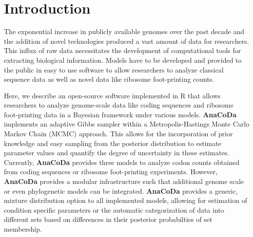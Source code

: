 \documentclass{bioinfo}
\newcommand{\pkg}[1]{{\fontseries{b}\selectfont #1}}
\newcommand{\package}{\textbf{AnaCoDa }} %
\begin{document}
\begin{abstract}
\section{Availability:}
\pkg{\package} is freely available under the Mozilla Public License 2.0
on CRAN (\url{http://cran.r-project.org/package=anacoda}).

\section{Contact:} \href{cedric.landerer@gmail.com}{cedric.landerer@gmail.com}
\end{abstract}


\section*{Introduction}
The exponential increase in publicly available genomes over the past decade and the addition of novel technologies produced a vast amount of data for researchers.  
This influx of raw data necessitates the development of computational tools for extracting biological information. 
Models have to be developed and provided to the public in easy to use software to allow researchers to analyze classical sequence data as well as novel data like ribosome foot-printing counts.

Here, we describe an open-source software implemented in R \citep{rcore} that allows researchers to analyze genome-scale data like coding sequences and ribosome foot-printing data in a Bayesian framework under various models. 
\package implements an adaptive Gibbs sampler within a Metropolis-Hastings Monte Carlo Markov Chain (MCMC) approach. This allows for the incorporation of prior knowledge and easy sampling from the posterior distribution to estimate parameter values and quantify the degree of uncertainty in these estimates.
Currently, \package provides three models to analyze codon counts obtained from coding sequences or ribosome foot-printing experiments. However, \package provides a modular infrastructure such that additional genome scale or even phylogenetic models can be integrated. 
\package provides a generic, mixture distribution option to all implemented models, allowing for estimation of condition specific parameters or the automatic categorization of data into different sets based on differences in their posterior probabilties of set membership.
\end{document}
